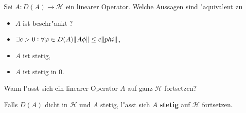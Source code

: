\documentclass[9pt]{article}
\newcommand{\Hi}{\mathcal{H}}
\newenvironment{field}{}{\newpage}
\newif\ifnote
\newenvironment{note}{\notetrue}{\notefalse}
\newcommand{\localtag}{}
\newcommand{\globaltag}{}
\newcommand{\uuid}{}
\newcommand{\tags}[1]{
    \ifnote 
        \renewcommand{\localtag}{#1}
    \else
        \renewcommand{\globaltag}{#1}
    \fi 
    }
\newcommand{\xplain}[1]{\renewcommand{\uuid}{#1}}
\begin{document}
	\begin{note}
		\xplain{UUID}
		\tags{6.1.4, satz}
		
		\begin{field}  %
			Sei $A:D(A) \rightarrow \Hi$ ein linearer Operator. Welche Aussagen sind "aquivalent zu
			\begin{itemize}
				\item $A$ ist beschr"ankt ?
			\end{itemize}
		\end{field}
		
		\begin{field}  %
			\begin{itemize}
				\item $\exists c>0 : \forall \varphi \in D(A) \norm{A\phi} \leq c\norm{phi}$,
				\item $A$ ist stetig,
				\item $A$ ist stetig in 0.
			\end{itemize}
		\end{field}
		
		\begin{field}  %
			Wann l"asst sich ein linearer Operator $A$ auf ganz $\Hi$ fortsetzen?
		\end{field}
		
		\begin{field}  %
			Falls $D(A)$ dicht in $\Hi$ und $A$ stetig, l"asst sich $A$ \textbf{stetig} auf $\Hi$ fortsetzen.
		\end{field}
	\end{note}
\end{document}
